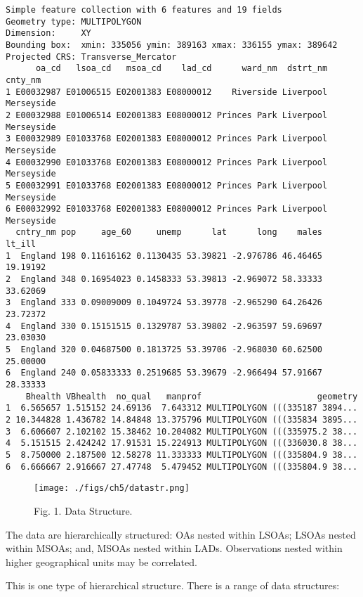 \documentclass[
  letterpaper,
  krantz2]{style/krantz}
\begin{document}
\begin{verbatim}
Simple feature collection with 6 features and 19 fields
Geometry type: MULTIPOLYGON
Dimension:     XY
Bounding box:  xmin: 335056 ymin: 389163 xmax: 336155 ymax: 389642
Projected CRS: Transverse_Mercator
      oa_cd   lsoa_cd   msoa_cd    lad_cd      ward_nm  dstrt_nm    cnty_nm
1 E00032987 E01006515 E02001383 E08000012    Riverside Liverpool Merseyside
2 E00032988 E01006514 E02001383 E08000012 Princes Park Liverpool Merseyside
3 E00032989 E01033768 E02001383 E08000012 Princes Park Liverpool Merseyside
4 E00032990 E01033768 E02001383 E08000012 Princes Park Liverpool Merseyside
5 E00032991 E01033768 E02001383 E08000012 Princes Park Liverpool Merseyside
6 E00032992 E01033768 E02001383 E08000012 Princes Park Liverpool Merseyside
  cntry_nm pop     age_60     unemp      lat      long    males   lt_ill
1  England 198 0.11616162 0.1130435 53.39821 -2.976786 46.46465 19.19192
2  England 348 0.16954023 0.1458333 53.39813 -2.969072 58.33333 33.62069
3  England 333 0.09009009 0.1049724 53.39778 -2.965290 64.26426 23.72372
4  England 330 0.15151515 0.1329787 53.39802 -2.963597 59.69697 23.03030
5  England 320 0.04687500 0.1813725 53.39706 -2.968030 60.62500 25.00000
6  England 240 0.05833333 0.2519685 53.39679 -2.966494 57.91667 28.33333
    Bhealth VBhealth  no_qual   manprof                       geometry
1  6.565657 1.515152 24.69136  7.643312 MULTIPOLYGON (((335187 3894...
2 10.344828 1.436782 14.84848 13.375796 MULTIPOLYGON (((335834 3895...
3  6.606607 2.102102 15.38462 10.204082 MULTIPOLYGON (((335975.2 38...
4  5.151515 2.424242 17.91531 15.224913 MULTIPOLYGON (((336030.8 38...
5  8.750000 2.187500 12.58278 11.333333 MULTIPOLYGON (((335804.9 38...
6  6.666667 2.916667 27.47748  5.479452 MULTIPOLYGON (((335804.9 38...
\end{verbatim}

\begin{figure}

{\centering \texttt{[image: ./figs/ch5/datastr.png]}

}

\caption{Fig. 1. Data Structure.}

\end{figure}

The data are hierarchically structured: OAs nested within LSOAs; LSOAs
nested within MSOAs; and, MSOAs nested within LADs. Observations nested
within higher geographical units may be correlated.

This is one type of hierarchical structure. There is a range of data
structures:
\end{document}
